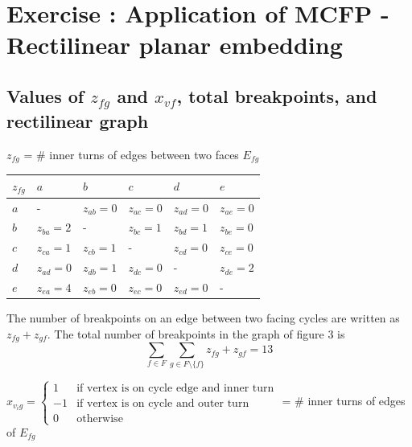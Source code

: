 \section{Exercise : Application of MCFP - Rectilinear planar embedding}

\subsection{Values of $z_{fg}$ and $x_{vf}$, total breakpoints, and rectilinear graph}

$z_{fg}$ = \# inner turns of edges between two faces $E_{fg}$

\begin{tabular}{l|lllll}
$z_{fg}$ & $a$ & $b$ & $c$ & $d$ & $e$  \\ \hline
$a$ & - & $z_{ab} = 0$ & $z_{ac} = 0$ & $z_{ad} = 0$ & $z_{ae} = 0$ \\
$b$ & $z_{ba} = 2$ & - & $z_{bc} = 1$ & $z_{bd} = 1$ & $z_{be} = 0$ \\
$c$ & $z_{ca} = 1$ & $z_{cb} = 1$ & - & $z_{cd} = 0$ & $z_{ce} = 0$ \\
$d$ & $z_{ad} = 0$ & $z_{db} = 1$ & $z_{dc} = 0$ & - & $z_{de} = 2$ \\
$e$ & $z_{ea} = 4$ & $z_{eb} = 0$ & $z_{ec} = 0$ & $z_{ed} = 0$ & - \\
\end{tabular}


The number of breakpoints on an edge between two facing cycles are written as $z_{fg} + z_{gf}$.
The total number of breakpoints in the graph of figure 3 is
$$ \sum_{f\in F} \sum_{g \in F \setminus{\{f\} }} {z_{fg} + z_{gf} }= 13$$


$x_{v_ig} = \begin{cases} 1 & \text{if vertex is on cycle edge and inner turn} \\
                         -1 & \text{if vertex is on cycle and outer turn} \\
                         0 & \text{otherwise} \end{cases}
$                         = \# inner turns of edges of $E_{fg}$

